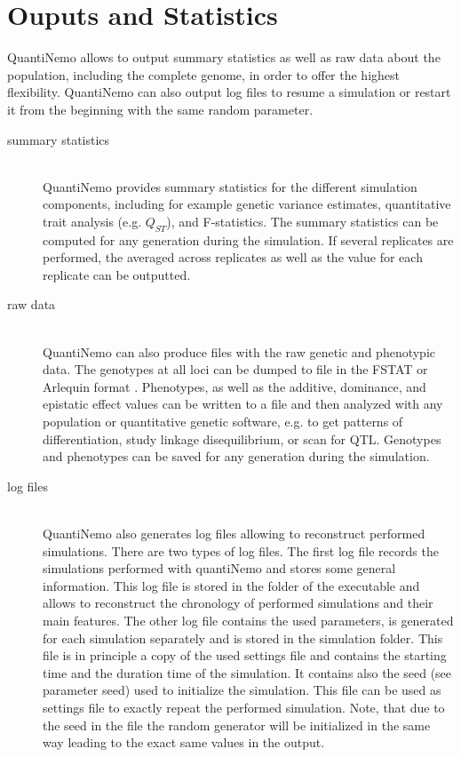 \documentclass[letterpaper,12pt,oneside]{book}
\begin{document}
\chapter{Ouputs and Statistics}
\label{chap:OutputsAndStatistics}
QuantiNemo allows to output summary statistics as well as raw data about the population, including the complete genome, in order to offer the highest flexibility. QuantiNemo can also output log files to resume a simulation or restart it from the beginning with the same random parameter. 
\begin{description}
\item[summary statistics]\hspace*{\fill}\\
QuantiNemo provides summary statistics for the different simulation components, including for example genetic variance estimates, quantitative trait analysis (e.g. $Q_{ST}$), and F-statistics. The summary statistics can be computed for any generation during the simulation. If several replicates are performed, the averaged across replicates as well as the value for each replicate can be outputted. 

\item[raw data]\hspace*{\fill}\\
QuantiNemo can also produce files with the raw genetic and phenotypic data. The genotypes at all loci can be dumped to file in the FSTAT  \citep{Goudet_1995} or Arlequin format \citep{Excoffier_2010}. Phenotypes, as well as the additive, dominance, and epistatic effect values can be written to a file and then analyzed with any population or quantitative genetic software, e.g. to get patterns of differentiation, study linkage disequilibrium, or scan for QTL. Genotypes and phenotypes can be saved for any generation during the simulation.

\item[log files]\hspace*{\fill}\\
QuantiNemo also generates log files allowing to reconstruct performed simulations. There are two types of log files. The first log file records the simulations performed with quantiNemo and stores some general information. This log file is stored in the folder of the executable and allows to reconstruct the chronology of performed simulations and their main features. The other log file contains the used parameters, is generated for each simulation separately and is stored in the simulation folder. This file is in principle a copy of the used settings file and contains the starting time and the duration time of the simulation. It contains also the seed (see parameter \textsf{seed}) used to initialize the simulation. This file can be used as settings file to exactly repeat the performed simulation. Note, that due to the seed in the file the random generator will be initialized in the same way leading to the exact same values in the output.
\end{description}
\end{document}
